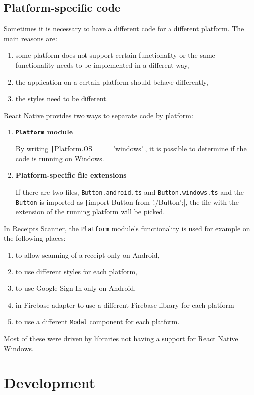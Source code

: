 \documentclass[
  digital, %
  table,   %
  oneside, %
  lof,     %
  lot,     %
]{fithesis3}
\newcommand{\code}[1]{\texttt|#1|} %
\begin{document}
\section{Platform-specific code}
\label{sec:platform_specific_code}
Sometimes it is necessary to have a different code for a different platform. The main reasons are:
\begin{enumerate}
\item some platform does not support certain functionality or the same functionality needs to be implemented in a different way,
\item the application on a certain platform should behave differently,
\item the styles need to be different.
\end{enumerate}

React Native provides two ways to separate code by platform:
\begin{enumerate}
\item \textbf{\texttt{Platform} module}
    
    By writing \code{Platform.OS === 'windows'}, it is possible to determine if the code is running on Windows.
\item \textbf{Platform-specific file extensions}

    If there are two files, \texttt{Button.android.ts} and \texttt{Button.windows.ts} and the \texttt{Button} is imported as \code{import Button from './Button';}‚ the file with the extension of the running platform will be picked.
\end{enumerate}

In Receipts Scanner, the \texttt{Platform} module's functionality is used for example on the following places:
\begin{enumerate}
    \item to allow scanning of a receipt only on Android,
    \item to use different styles for each platform,
    \item to use Google Sign In only on Android,
    \item in Firebase adapter to use a different Firebase library for each platform 
    \item to use a different \texttt{Modal} component for each platform.
\end{enumerate}
Most of these were driven by libraries not having a support for React Native Windows.

\chapter{Development}
\end{document}
